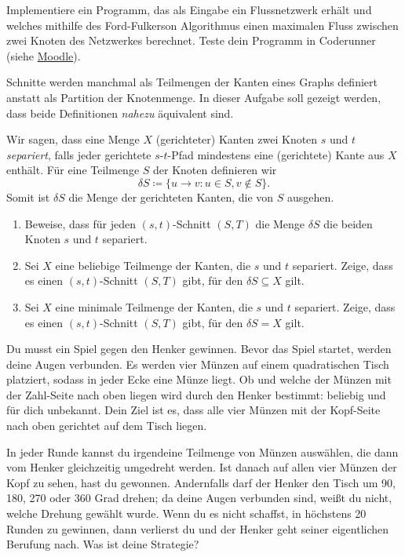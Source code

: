\documentclass{uebung_cs}
\begin{document}
\begin{aufgabe}
    Implementiere ein Programm, das als Eingabe ein Flussnetzwerk erhält und welches mithilfe des Ford-Fulkerson Algorithmus einen maximalen Fluss zwischen zwei Knoten des Netzwerkes berechnet.
    Teste dein Programm in Coderunner (siehe \href{https://moodle.studiumdigitale.uni-frankfurt.de/moodle/course/view.php?id=2241}{Moodle}).
\end{aufgabe}

\begin{aufgabe}
  Schnitte werden manchmal als Teilmengen der Kanten eines Graphs definiert anstatt als Partition der Knotenmenge.
  In dieser Aufgabe soll gezeigt werden, dass beide Definitionen \emph{nahezu} äquivalent sind.

  Wir sagen, dass eine Menge $X$ (gerichteter) Kanten zwei Knoten $s$ und $t$ \emph{separiert}, falls jeder gerichtete $s$-$t$-Pfad mindestens eine (gerichtete) Kante aus $X$ enthält.
  Für eine Teilmenge $S$ der Knoten definieren wir
  \[δS \coloneqq \{u \to v : u \in S, v \not\in S\}.\]
  Somit ist $δS$ die Menge der gerichteten Kanten, die von $S$ ausgehen.

  \begin{enumerate}
    \item Beweise, dass für jeden $(s,t)$-Schnitt $(S,T)$ die Menge $δS$ die beiden Knoten $s$ und $t$ separiert.
    \item Sei $X$ eine beliebige Teilmenge der Kanten, die $s$ und $t$ separiert.
    Zeige, dass es einen $(s,t)$-Schnitt $(S,T)$ gibt, für den $δS \subseteq X$ gilt.
    \item Sei $X$ eine minimale Teilmenge der Kanten, die $s$ und $t$ separiert.
    Zeige, dass es einen $(s,t)$-Schnitt $(S,T)$ gibt, für den $δS = X$ gilt.
  \end{enumerate}
\end{aufgabe}

\begin{aufgabe}
    Du musst ein Spiel gegen den Henker gewinnen. Bevor das Spiel startet, werden deine Augen verbunden. Es werden vier Münzen auf einem quadratischen Tisch platziert, sodass in jeder Ecke eine Münze liegt. Ob und welche der Münzen mit der Zahl-Seite nach oben liegen wird durch den Henker bestimmt: beliebig und für dich unbekannt. Dein Ziel ist es, dass alle vier Münzen mit der Kopf-Seite nach oben gerichtet auf dem Tisch liegen.
    
    In jeder Runde kannst du irgendeine Teilmenge von Münzen auswählen, die dann vom Henker gleichzeitig umgedreht werden. Ist danach auf allen vier Münzen der Kopf zu sehen, hast du gewonnen. Andernfalls darf der Henker den Tisch um 90, 180, 270 oder 360 Grad drehen; da deine Augen verbunden sind, weißt du nicht, welche Drehung gewählt wurde. Wenn du es nicht schaffst, in höchstens 20 Runden zu gewinnen, dann verlierst du und der Henker geht seiner eigentlichen Berufung nach. Was ist deine Strategie?
\end{aufgabe}
\end{document}
